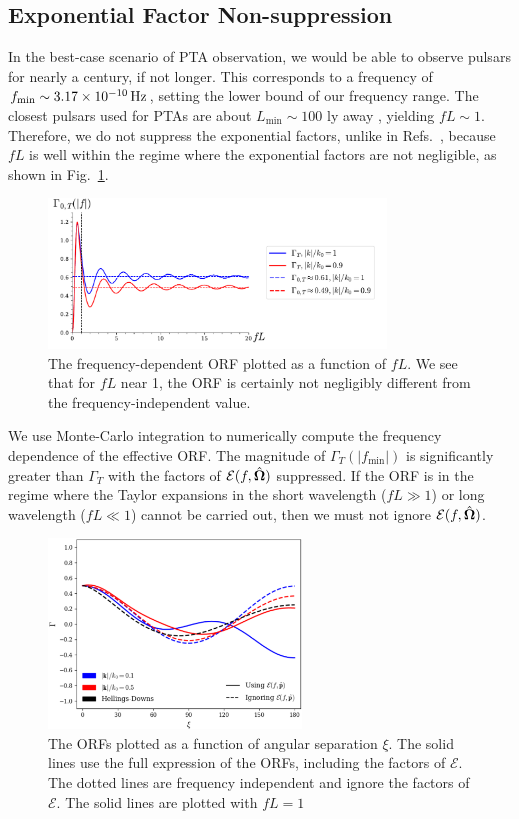 \documentclass[prd,aps,psfig,nofootinbib,nobibnotes,superscriptaddress,preprintnumbers,times]{revtex4-2}\setlength{\topmargin}{-14mm}
\newcommand{\Hz}{\,{\rm Hz}}
\begin{document}
\subsection{Exponential Factor Non-suppression}\label{subsec:exp_fac}
In the best-case scenario of PTA observation, we would be able to observe pulsars for nearly a century, if not longer. This corresponds to a frequency of $f_{\text{min}} \sim 3.17 \times 10^{-10} \Hz$, setting the lower bound of our frequency range. The closest pulsars used for PTAs are about $L_{\text{min}} \sim 100$ ly away \cite{Anholm:2008wy}, yielding $fL \sim 1$. Therefore, we do not suppress the exponential factors, unlike in Refs.\ \cite{Liang:2021bct,Arjona:2024cex}, because $fL$ is well within the regime where the exponential factors are not negligible, as shown in Fig.\ \ref{fig:freq_dep}.
\begin{figure}[h]
    \centering
    \includegraphics[width=0.8\textwidth]{fig0.pdf}
    \caption{The frequency-dependent ORF plotted as a function of $fL$. We see that for $fL$ near 1, the ORF is certainly not negligibly different from the frequency-independent value.}
    \label{fig:freq_dep}
\end{figure}
We use Monte-Carlo integration to numerically compute the frequency dependence of the effective ORF. The magnitude of $\Gamma_T(|f_{\text{min}}|)$ is significantly greater than $\Gamma_T$ with the factors of $\mathcal{E}(f, \hat{\bf \Omega})$ suppressed. If the ORF is in the regime where the Taylor expansions in the short wavelength ($fL \gg 1$) or long wavelength ($fL \ll 1$) cannot be carried out, then we must not ignore $\mathcal{E}(f, \hat{\bf \Omega})$.
\begin{figure}[h]
    \centering
    \includegraphics[width=0.6\textwidth]{fig1.pdf}
    \caption{The ORFs plotted as a function of angular separation $\xi$. The solid lines use the full expression of the ORFs, including the factors of $\mathcal{E}$. The dotted lines are frequency independent and ignore the factors of $\mathcal{E}$. The solid lines are plotted with $fL = 1$}
    \label{fig:orfs}
\end{figure}
\end{document}
